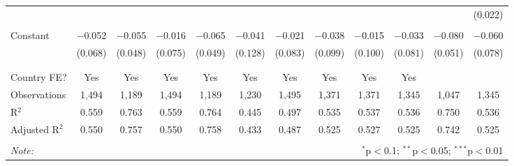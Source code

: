 \begin{table}[!htbp]
\begin{tabular}{@{\extracolsep{5pt}}lccccccccccc}
  &  &  &  &  &  &  &  &  &  &  & (0.022) \\ 
  & & & & & & & & & & & \\ 
 Constant & $-$0.052 & $-$0.055 & $-$0.016 & $-$0.065 & $-$0.041 & $-$0.021 & $-$0.038 & $-$0.015 & $-$0.033 & $-$0.080 & $-$0.060 \\ 
  & (0.068) & (0.048) & (0.075) & (0.049) & (0.128) & (0.083) & (0.099) & (0.100) & (0.081) & (0.051) & (0.078) \\ 
  & & & & & & & & & & & \\ 
\hline \\[-1.8ex] 
Country FE? & Yes & Yes & Yes & Yes & Yes & Yes & Yes & Yes & Yes &  &  \\ 
Observations & 1,494 & 1,189 & 1,494 & 1,189 & 1,230 & 1,495 & 1,371 & 1,371 & 1,345 & 1,047 & 1,345 \\ 
R$^{2}$ & 0.559 & 0.763 & 0.559 & 0.764 & 0.445 & 0.497 & 0.535 & 0.537 & 0.536 & 0.750 & 0.536 \\ 
Adjusted R$^{2}$ & 0.550 & 0.757 & 0.550 & 0.758 & 0.433 & 0.487 & 0.525 & 0.527 & 0.525 & 0.742 & 0.525 \\ 
\hline 
\hline \\[-1.8ex] 
\textit{Note:}  & \multicolumn{11}{r}{$^{*}$p$<$0.1; $^{**}$p$<$0.05; $^{***}$p$<$0.01} \\ 
\end{tabular} 
\end{table} 
